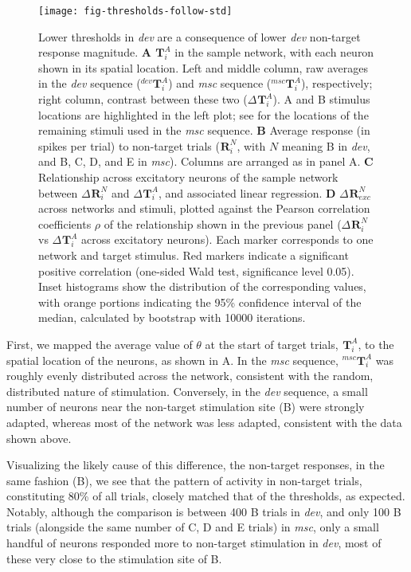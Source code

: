 \documentclass[9pt,lineno,onehalfspacing]{elife}
\newcommand{\dev}{\textit{dev}}
\newcommand{\msc}{\textit{msc}}
\newcommand{\R}[3][]{{}^{#1}_{}\boldsymbol R^{#2}_{#3}}
\newcommand{\T}[3][]{{}^{#1}_{}\boldsymbol T^{#2}_{#3}}
\begin{document}
\begin{figure}
    \texttt{[image: fig-thresholds-follow-std]}
    \caption{%
        Lower thresholds in \dev{} are a consequence of lower \dev{} non-target response magnitude.
        \textbf{A} $\T{A}{i}$ in the sample network, with each neuron shown in its spatial location. Left and middle column, raw averages in the \dev{} sequence ($\T[dev]{A}{i}$) and \msc{} sequence ($\T[msc]{A}{i}$), respectively; right column, contrast between these two ($\Delta \T{A}{i}$). A and B stimulus locations are highlighted in the left plot; see  for the locations of the remaining stimuli used in the \msc{} sequence.
        \textbf{B} Average response (in spikes per trial) to non-target trials ($\R{N}{i}$, with $N$ meaning B in \dev{}, and B, C, D, and E in \msc{}). Columns are arranged as in panel A.
        \textbf{C} Relationship across excitatory neurons of the sample network between $\Delta \R{N}{i}$ and $\Delta \T{A}{i}$, and associated linear regression.
        \textbf{D} $\Delta \R{N}{exc}$ across networks and stimuli, plotted against the Pearson correlation coefficients $\rho$ of the relationship shown in the previous panel ($\Delta \R{N}{i}$ vs $\Delta \T{A}{i}$ across excitatory neurons). Each marker corresponds to one network and target stimulus. Red markers indicate a significant positive correlation (one-sided Wald test, significance level 0.05). Inset histograms show the distribution of the corresponding values, with orange portions indicating the 95\% confidence interval of the median, calculated by bootstrap with 10000 iterations.
    }
    \label{fig:thresholds-follow-std}
\end{figure}

First, we mapped the average value of $\theta$ at the start of target trials, $\T{A}{i}$, to the spatial location of the neurons, as shown in A. In the \msc{} sequence, $\T[msc]{A}{i}$ was roughly evenly distributed across the network, consistent with the random, distributed nature of stimulation. Conversely, in the \dev{} sequence, a small number of neurons near the non-target stimulation site (B) were strongly adapted, whereas most of the network was less adapted, consistent with the data shown above.

Visualizing the likely cause of this difference, the non-target responses, in the same fashion (B), we see that the pattern of activity in non-target trials, constituting 80\% of all trials, closely matched that of the thresholds, as expected. Notably, although the comparison is between 400 B trials in \dev{}, and only 100 B trials (alongside the same number of C, D and E trials) in \msc{}, only a small handful of neurons responded more to non-target stimulation in \dev{}, most of these very close to the stimulation site of B.
\end{document}
